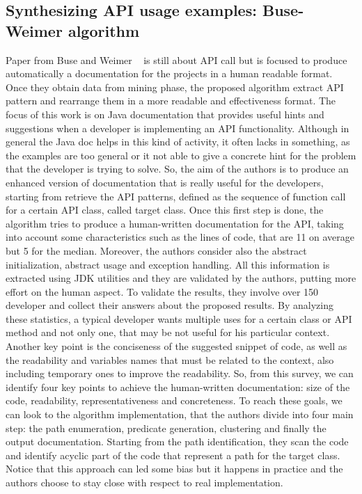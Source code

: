 


\subsection{Synthesizing API usage examples: Buse-Weimer algorithm}
Paper from Buse and Weimer  ~\cite{buse_synthesizing_2012} is still about API call but is focused to produce automatically a documentation for the projects in a human readable format.
Once they obtain data from mining phase, the proposed algorithm extract API pattern and rearrange them in a more readable and effectiveness format. The focus of this work is on Java documentation that provides useful hints and suggestions when a developer is implementing an API functionality. Although in general the Java doc helps in this kind of activity, it often lacks in something, as the examples are too general or it not able to give a concrete hint for the problem that the developer is trying to solve. So, the aim of the authors is to produce an enhanced version of documentation that is really useful for the developers, starting from retrieve the API patterns, defined as the sequence of function call for a certain API class, called target class. Once this first step is done, the algorithm tries to produce a human-written documentation for the API, taking into account some characteristics such as the lines of code, that are 11 on average but 5 for the median. Moreover, the authors consider also the abstract initialization, abstract usage and exception handling. All this information is extracted using JDK utilities and they are validated by the authors, putting more effort on the human aspect. To validate the results, they involve over 150 developer and collect their answers about the proposed results. By analyzing these statistics, a typical developer wants multiple uses for a certain class or API method and not only one, that may be not useful for his particular context. Another key point is the conciseness of the suggested snippet of code, as well as the readability and variables names that must be related to the context, also including temporary ones to improve the readability. So, from this survey, we can identify four key points to achieve the human-written documentation: size of the code, readability, representativeness and concreteness.\newline
To reach these goals, we can look to the algorithm implementation, that the authors divide into four main step: the path enumeration, predicate generation, clustering and finally the output documentation. Starting from the path identification, they scan the code and identify acyclic part of the code that represent a path for the target class. Notice that this approach can led some bias but it happens in practice and the authors choose to stay close with respect to real implementation. 
